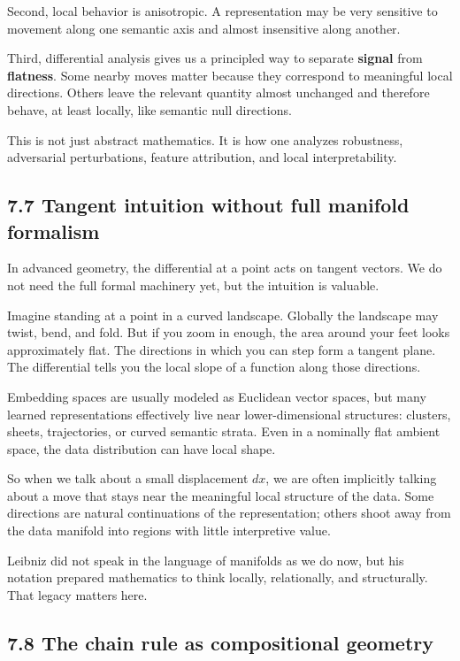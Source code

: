 Second, local behavior is anisotropic. A representation may be very
sensitive to movement along one semantic axis and almost insensitive
along another.

Third, differential analysis gives us a principled way to separate
\textbf{signal} from \textbf{flatness}. Some nearby moves matter because
they correspond to meaningful local directions. Others leave the
relevant quantity almost unchanged and therefore behave, at least
locally, like semantic null directions.

This is not just abstract mathematics. It is how one analyzes
robustness, adversarial perturbations, feature attribution, and local
interpretability.

\hypertarget{tangent-intuition-without-full-manifold-formalism}{%
\subsection{7.7 Tangent intuition without full manifold
formalism}\label{tangent-intuition-without-full-manifold-formalism}}

In advanced geometry, the differential at a point acts on tangent
vectors. We do not need the full formal machinery yet, but the intuition
is valuable.

Imagine standing at a point in a curved landscape. Globally the
landscape may twist, bend, and fold. But if you zoom in enough, the area
around your feet looks approximately flat. The directions in which you
can step form a tangent plane. The differential tells you the local
slope of a function along those directions.

Embedding spaces are usually modeled as Euclidean vector spaces, but
many learned representations effectively live near lower-dimensional
structures: clusters, sheets, trajectories, or curved semantic strata.
Even in a nominally flat ambient space, the data distribution can have
local shape.

So when we talk about a small displacement \(dx\), we are often
implicitly talking about a move that stays near the meaningful local
structure of the data. Some directions are natural continuations of the
representation; others shoot away from the data manifold into regions
with little interpretive value.

Leibniz did not speak in the language of manifolds as we do now, but his
notation prepared mathematics to think locally, relationally, and
structurally. That legacy matters here.

\hypertarget{the-chain-rule-as-compositional-geometry}{%
\subsection{7.8 The chain rule as compositional
geometry}\label{the-chain-rule-as-compositional-geometry}}


